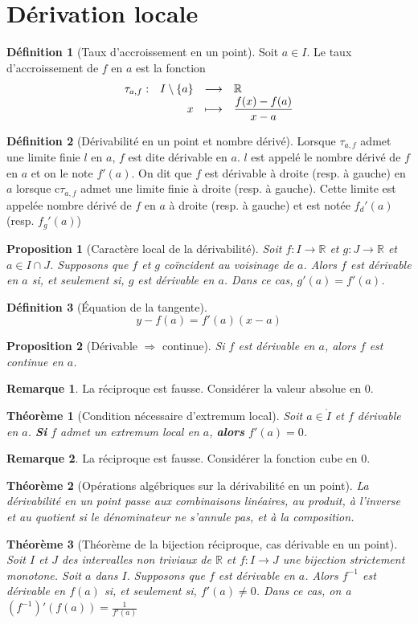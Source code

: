 \documentclass[french]{book}
\newcommand{\R}{\mathbb{R}}
\newcommand{\inv}{^{-1}}
\theoremstyle{plain}
\newtheorem{thm}{Théorème}[chapter]
\newtheorem{prop}{Proposition}[chapter]
\theoremstyle{definition}
\newtheorem{dfn}{Définition}[chapter]
\newtheorem{rmq}{Remarque}[chapter]
\theoremstyle{remark}
\begin{document}
\section{Dérivation locale}
\begin{dfn}[Taux d'accroissement en un point]
	Soit $a\in I$. Le taux d'accroissement de $f$ en $a$ est la fonction
	$$
	\begin{array}[t]{lrcl}
		\tau_{a,f}: & I\setminus \left\{a\right\} & \longrightarrow & \R \\
		& x & \longmapsto & \displaystyle \frac{f(x)-f(a)}{x-a}
	\end{array}
	$$
\end{dfn}
\begin{dfn}[Dérivabilité en un point et nombre dérivé]
	Lorsque $\tau_{a,f}$ admet une limite finie $l$ en $a$, $f$ est dite dérivable en $a$. $l$ est appelé le nombre dérivé de $f$ en $a$ et on le note $f'(a)$. On dit que $f$ est dérivable à droite (resp. à gauche) en $a$ lorsque c$\tau_{a,f}$ admet une limite finie à droite (resp. à gauche). Cette limite est appelée nombre dérivé de $f$ en $a$ à droite (resp. à gauche) et est notée $f_d'(a)$ (resp. $f_g'(a)$)
\end{dfn}
\begin{prop}[Caractère local de la dérivabilité]
	Soit $f:I\rightarrow\R$ et $g:J\rightarrow\R$ et $a\in I\cap J$. Supposons que $f$ et $g$ coïncident au voisinage de $a$. Alors $f$ est dérivable en $a$ si, et seulement si, $g$ est dérivable en $a$. Dans ce cas, $g'(a)=f'(a)$.
\end{prop}
\begin{dfn}[Équation de la tangente]
	$$y-f(a)=f'(a)(x-a)$$
\end{dfn}
\begin{prop}[Dérivable $\Rightarrow$ continue]
	Si $f$ est dérivable en $a$, alors $f$ est continue en $a$.
\end{prop}
\begin{rmq} La réciproque est fausse. Considérer la valeur absolue en 0. \end{rmq}
\begin{thm}[Condition nécessaire d'extremum local]
	Soit $a\in\mathring{I}$ et $f$ dérivable en $a$. \textbf{Si} $f$ admet un extremum local en $a$, \textbf{alors} $f'(a)=0$. 
\end{thm}
\begin{rmq} La réciproque est fausse. Considérer la fonction cube en 0. \end{rmq}
\begin{thm}[Opérations algébriques sur la dérivabilité en un point]
	La dérivabilité en un point passe aux combinaisons linéaires, au produit, à l'inverse et au quotient si le dénominateur ne s'annule pas, et à la composition.
\end{thm}
\begin{thm}[Théorème de la bijection réciproque, cas dérivable en un point]
Soit $I$ et $J$ des intervalles non triviaux de $\R$ et $f:I\rightarrow J$ une bijection strictement monotone. Soit $a$ dans $I$. Supposons que $f$ est dérivable en $a$. Alors $f\inv$ est dérivable en $f(a)$ si, et seulement si, $f'(a)\ne 0$. Dans ce cas, on a $\displaystyle (f\inv)'(f(a))=\frac{1}{f'(a)}$
\end{thm}
\end{document}
